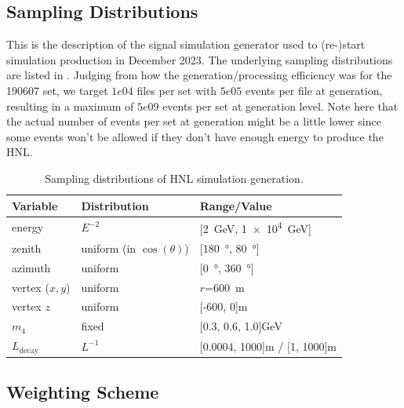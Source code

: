 \subsection{Sampling Distributions}

This is the description of the signal simulation generator used to (re-)start simulation production in December 2023. The underlying sampling distributions are listed in . Judging from how the generation/processing efficiency was for the 190607 set, we target $1e04$ files per set with $5e05$ events per file at generation, resulting in a maximum of $5e09$ events per set at generation level. Note here that the actual number of events per set at generation might be a little lower since some events won't be allowed if they don't have enough energy to produce the HNL.

\begin{table}
    \centering
    \begin{tabular} { lll }
        \hline \hline 
        \textbf{Variable} & \textbf{Distribution} & \textbf{Range/Value} \\
        \hline \hline 
        energy & $E^{-2}$ & [\SI{2}{\GeV}, \SI{1e4}{\GeV}] \\
        zenith & uniform (in $\cos(\theta)$) & [\SI{180}{\degree}, \SI{80}{\degree}] \\
        azimuth & uniform & [\SI{0}{\degree}, \SI{360}{\degree}] \\
        vertex ($x,y$) & uniform & $r$=\SI{600}{\metre} \\
        vertex $z$ & uniform & [-600, 0]\si{\metre} \\
        $m_\mathrm{4}$ & fixed & [0.3, 0.6, 1.0]\si{\GeV} \\
        $L_\mathrm{decay}$ & $L^{-1}$ & [0.0004, 1000]\si{\metre} / [1, 1000]\si{\metre} \\
        \hline
    \end{tabular}
    \caption[xx]{Sampling distributions of HNL simulation generation.}   
\end{table}


\subsection{Weighting Scheme}


